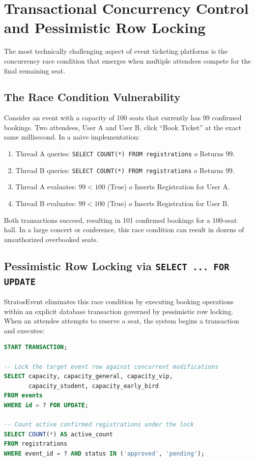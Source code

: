 \documentclass[11pt,a4paper]{report}
\begin{document}
\section{Transactional Concurrency Control and Pessimistic Row Locking}
\justifying
The most technically challenging aspect of event ticketing platforms is the concurrency race condition that emerges when multiple attendees compete for the final remaining seat.

\subsection{The Race Condition Vulnerability}
Consider an event with a capacity of 100 seats that currently has 99 confirmed bookings. Two attendees, User A and User B, click ``Book Ticket'' at the exact same millisecond. In a naive implementation:
\begin{enumerate}[leftmargin=1.5em, itemsep=0.2em]
    \item Thread A queries: \texttt{SELECT COUNT(*) FROM registrations} $	o$ Returns 99.
    \item Thread B queries: \texttt{SELECT COUNT(*) FROM registrations} $	o$ Returns 99.
    \item Thread A evaluates: $99 < 100$ (True) $	o$ Inserts Registration for User A.
    \item Thread B evaluates: $99 < 100$ (True) $	o$ Inserts Registration for User B.
\end{enumerate}
Both transactions succeed, resulting in 101 confirmed bookings for a 100-seat hall. In a large concert or conference, this race condition can result in dozens of unauthorized overbooked seats.

\subsection{Pessimistic Row Locking via \texttt{SELECT ... FOR UPDATE}}
StratosEvent eliminates this race condition by executing booking operations within an explicit database transaction governed by pessimistic row locking. When an attendee attempts to reserve a seat, the system begins a transaction and executes:

\begin{lstlisting}[language=SQL]
START TRANSACTION;

-- Lock the target event row against concurrent modifications
SELECT capacity, capacity_general, capacity_vip, 
       capacity_student, capacity_early_bird 
FROM events 
WHERE id = ? FOR UPDATE;

-- Count active confirmed registrations under the lock
SELECT COUNT(*) AS active_count 
FROM registrations 
WHERE event_id = ? AND status IN ('approved', 'pending');
\end{lstlisting}
\end{document}
